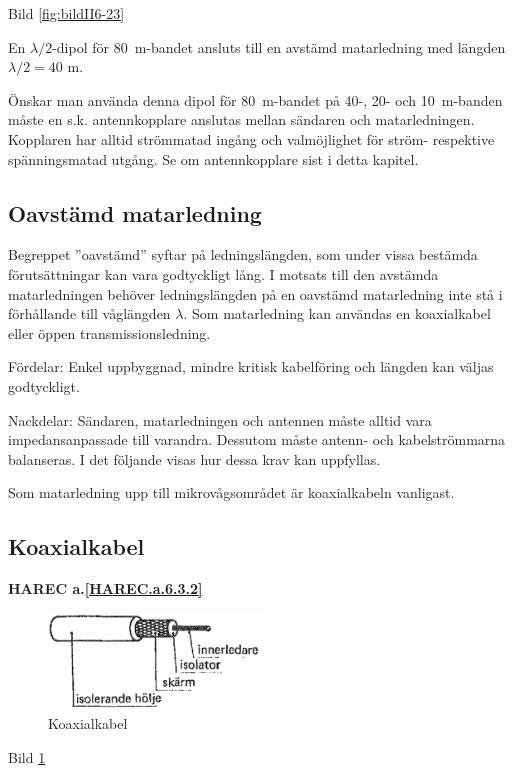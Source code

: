 Bild \ref{fig:bildII6-23}

En \(\lambda/2\)-dipol för 80~m-bandet ansluts till en avstämd
matarledning med längden \(\lambda/2 = 40\) m.

Önskar man använda denna dipol för 80~m-bandet på 40-, 20- och 10~m-banden
måste en s.k. antennkopplare anslutas mellan sändaren och matarledningen.
Kopplaren har alltid strömmatad ingång och valmöjlighet för ström- respektive
spänningsmatad utgång.
Se om antennkopplare sist i detta kapitel.

\subsection{Oavstämd matarledning}

Begreppet ''oavstämd'' syftar på ledningslängden, som under vissa
bestämda förutsättningar kan vara godtyckligt lång. I motsats till den
avstämda matarledningen behöver ledningslängden på en oavstämd
matarledning inte stå i förhållande till våglängden \(\lambda\). Som
matarledning kan användas en koaxialkabel eller öppen
transmissionsledning.

Fördelar: Enkel uppbyggnad, mindre kritisk kabelföring och längden kan
väljas godtyckligt.

Nackdelar: Sändaren, matarledningen och antennen måste alltid vara
impedansanpassade till varandra. Dessutom måste antenn- och
kabelströmmarna balanseras. I det följande visas hur dessa krav kan
uppfyllas.

Som matarledning upp till mikrovågsområdet är koaxialkabeln vanligast.

\subsection{Koaxialkabel}
\textbf{
HAREC a.\ref{HAREC.a.6.3.2}\label{myHAREC.a.6.3.2}
}

\begin{figure}
  \includegraphics[width=0.5\textwidth]{images/cropped_pdfs/bild_2_6-24.pdf}
  \caption{Koaxialkabel}
  \label{fig:bildII6-24}
\end{figure}

Bild \ref{fig:bildII6-24}

